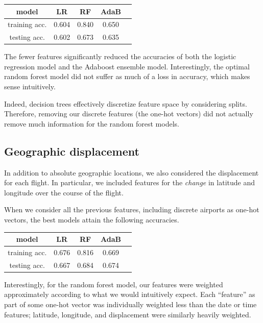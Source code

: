 \documentclass{article}
\begin{document}
\begin{multicols}{2}
\begin{center}
    \begin{tabular}{c|cccc}
        model &
          LR & RF & AdaB \\\hline
        training acc. &
          0.604 & 0.840 & 0.650 \\
        testing acc. &
          0.602 & 0.673 & 0.635
    \end{tabular}
\end{center}

The fewer features significantly reduced the accuracies
of both the logistic regression model and the Adaboost ensemble model.
Interestingly, the optimal random forest model
did not suffer as much of a loss in accuracy,
which makes sense intuitively.

Indeed, decision trees effectively discretize feature space
by considering splits.
Therefore, removing our discrete features (the one-hot vectors)
did not actually remove much information for the random forest models.

\subsection{Geographic displacement}

In addition to absolute geographic locations,
we also considered the displacement for each flight.
In particular, we included features for
the \emph{change} in latitude and longitude
over the course of the flight.

When we consider all the previous features,
including discrete airports as one-hot vectors,
the best models attain the following accuracies.

\begin{center}
    \begin{tabular}{c|cccc}
        model &
          LR & RF & AdaB \\\hline
        training acc. &
          0.676 & 0.816 & 0.669 \\
        testing acc. &
         0.667 & 0.684 & 0.674
    \end{tabular}
\end{center}

Interestingly, for the random forest model,
our features were weighted approximately
according to what we would intuitively expect.
Each ``feature'' as part of some one-hot vector
was individually weighted less than the date or time features;
latitude, longitude, and displacement were similarly
heavily weighted.


\end{multicols}
\end{document}
